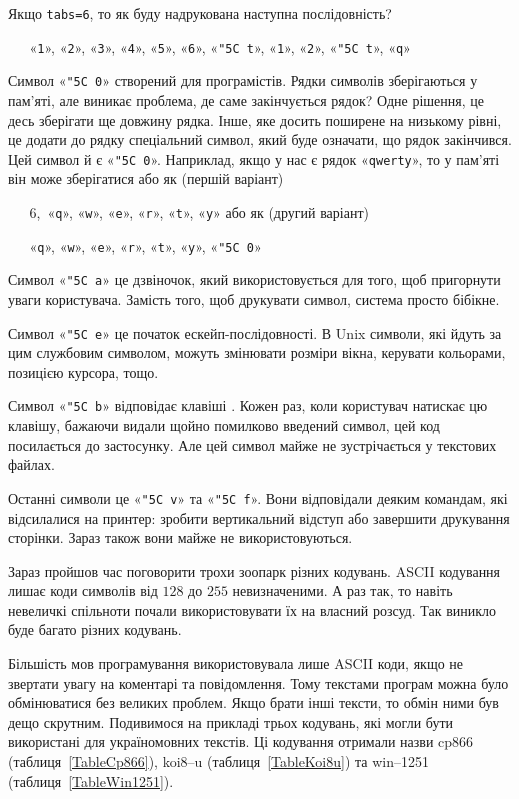 \documentclass{book}
\newcommand{\escape}[1]{\texttt{\char"5C #1}}
\newcommand{\textseq}[1]{\par\vbox{\texttt{~~~}#1}}
\newcommand{\id}[1]{\texttt{#1}}
\newcommand{\chr}[1]{«\texttt{#1}»}
\newcommand{\chesc}[1]{\chr{\escape{#1}}}
\begin{document}
\goodbreak
\begin{exercise}
Якщо \id{tabs=6}, то як буду надрукована наступна послідовність?
\textseq{\chr1, \chr2, \chr3, \chr4, \chr5, \chr6, \chesc t, \chr1, \chr2, \chesc t, \chr q}
\end{exercise}

Символ \chesc 0 створений для програмістів.
Рядки символів зберігаються у пам'яті, але виникає проблема, де саме закінчується рядок?
Одне рішення, це десь зберігати ще довжину рядка.
Інше, яке досить поширене на низькому рівні, це додати до рядку спеціальний символ, який буде означати, що рядок закінчився.
Цей символ й є \chesc 0.
Наприклад, якщо у нас є рядок \chr{qwerty}, то у пам'яті він може зберігатися або як (першій варіант)
\textseq{\textrm{$6$,}~\chr q, \chr w, \chr e, \chr r, \chr t, \chr y}
\noindent або як (другий варіант)
\textseq{\chr q, \chr w, \chr e, \chr r, \chr t, \chr y, \chesc 0}

Символ \chesc a це дзвіночок, який використовується для того, щоб пригорнути уваги користувача.
Замість того, щоб друкувати символ, система просто бібікне.

Символ \chesc e це початок ескейп-послідовності.
В Unix символи, які йдуть за цим службовим символом, можуть змінювати розміри вікна, керувати кольорами, позицією курсора, тощо.

Символ \chesc b відповідає клавіші \keys{\backspace}.
Кожен раз, коли користувач натискає цю клавішу, бажаючи видали щойно помилково введений символ, цей код посилається до застосунку.
Але цей символ майже не зустрічається у текстових файлах.

Останні символи це \chesc v та \chesc f.
Вони відповідали деяким командам, які відсилалися на принтер: зробити вертикальний відступ або завершити друкування сторінки.
Зараз також вони майже не використовуються.

\medskip

Зараз пройшов час поговорити трохи зоопарк різних кодувань.
ASCII кодування лишає коди символів від $128$ до $255$ невизначеними.
А раз так, то навіть невеличкі спільноти почали використовувати їх на власний розсуд.
Так виникло буде багато різних кодувань.

Більшість мов програмування використовувала лише ASCII коди, якщо не звертати увагу на коментарі та повідомлення.
Тому текстами програм можна було обмінюватися без великих проблем.
Якщо брати інші тексти, то обмін ними був дещо скрутним.
Подивимося на прикладі трьох кодувань,  які могли бути використані для україномовних текстів.
Ці кодування отримали назви cp866 (таблиця~\ref{TableCp866}), koi8--u (таблиця~\ref{TableKoi8u}) та win--1251 (таблиця~\ref{TableWin1251}).
\end{document}
